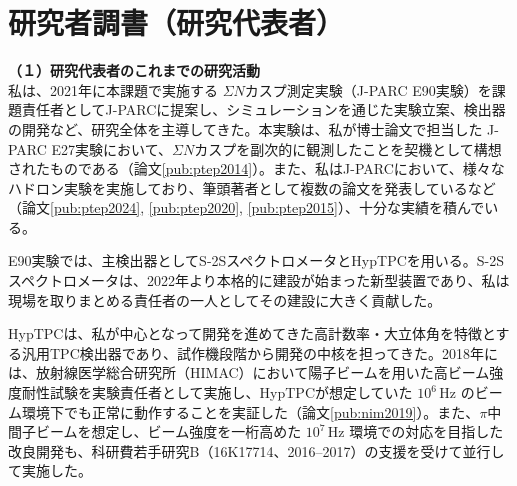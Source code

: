 
\section{研究者調書（研究代表者）}

\renewcommand{\研究者氏名}{市川裕大}
\renewcommand{\研究者氏名ふりがな}{いちかわ ゆうだい}
\renewcommand{\研究者生年月日の年}{1986}
\renewcommand{\研究者生年月日の月}{5}
\renewcommand{\研究者生年月日の日}{31}
\renewcommand{\研究者年齢}{39}
\renewcommand{\研究者所属機関部局職}{\small{東北大学・大学院理学研究科・准教授}}	%
\renewcommand{\研究者学位}{博士（理学）}



	\noindent
	\textbf{（１）研究代表者のこれまでの研究活動}\\
	私は、2021年に本課題で実施する $\Sigma N$カスプ測定実験（J-PARC E90実験）を課題責任者としてJ-PARCに提案し、シミュレーションを通じた実験立案、検出器の開発など、研究全体を主導してきた。本実験は、私が博士論文で担当した J-PARC E27実験において、$\Sigma N$カスプを副次的に観測したことを契機として構想されたものである（論文\ref{pub:ptep2014}）。また、私はJ-PARCにおいて、様々なハドロン実験を実施しており、筆頭著者として複数の論文を発表しているなど（論文\ref{pub:ptep2024}, \ref{pub:ptep2020}, \ref{pub:ptep2015}）、十分な実績を積んでいる。

	E90実験では、主検出器としてS-2SスペクトロメータとHypTPCを用いる。S-2Sスペクトロメータは、2022年より本格的に建設が始まった新型装置であり、私は現場を取りまとめる責任者の一人としてその建設に大きく貢献した。

	HypTPCは、私が中心となって開発を進めてきた高計数率・大立体角を特徴とする汎用TPC検出器であり、試作機段階から開発の中核を担ってきた。2018年には、放射線医学総合研究所（HIMAC）において陽子ビームを用いた高ビーム強度耐性試験を実験責任者として実施し、HypTPCが想定していた $10^6\,\mathrm{Hz}$ のビーム環境下でも正常に動作することを実証した（論文\ref{pub:nim2019}）。また、$\pi$中間子ビームを想定し、ビーム強度を一桁高めた $10^7\,\mathrm{Hz}$ 環境での対応を目指した改良開発も、科研費若手研究B（16K17714、2016--2017）の支援を受けて並行して実施した。

